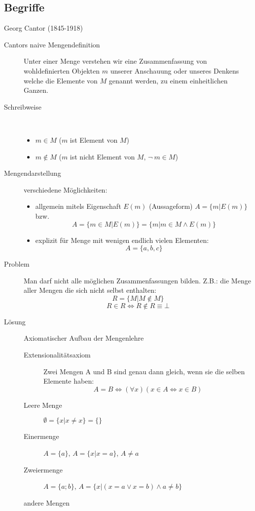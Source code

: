 \documentclass[12pt,a4paper]{article}
\begin{document}
\subsection{Begriffe}
Georg Cantor (1845-1918)
\begin{description}
	\item[Cantors naive Mengendefinition] Unter einer Menge verstehen wir eine Zusammenfassung von wohldefinierten Objekten $m$ unserer Anschauung oder unseres Denkens welche die Elemente von $M$ genannt werden, zu einem einheitlichen Ganzen.
		\item[Schreibweise]\
		\begin{itemize}
			\item $m \in M$ ($m$ ist Element von $M$)
			\item $m \not\in M$ ($m$ ist nicht Element von $M$, $\neg\ m \in M$)
		\end{itemize}
	\item[Mengendarstellung] verschiedene Möglichkeiten:
		\begin{itemize}
			\item allgemein mitels Eigenschaft $E(m)$ (Aussageform) $A=\lbrace m|E(m) \rbrace$ bzw.
			      $$A = \lbrace m \in M | E(m) \rbrace = \lbrace m | m \in M \wedge E(m) \rbrace$$
			\item explizit für Menge mit wenigen endlich vielen Elementen:
			      $$A=\lbrace a, b, c\rbrace$$
		\end{itemize}
	\item[Problem] Man darf nicht alle möglichen Zusammenfassungen bilden. Z.B.: die Menge aller Mengen die sich nicht selbst enthalten:
		$$R=\lbrace M | M \not \in M \rbrace$$
		$$R \in R \Leftrightarrow R \not \in R \equiv \bot$$
	\item[Lösung] Axiomatischer Aufbau der Mengenlehre
		\begin{description}
			\item[Extensionalitätsaxiom] Zwei Mengen A und B sind genau dann gleich, wenn sie die selben Elemente haben:
				$$A = B \Leftrightarrow (\forall x)(x \in A \Leftrightarrow x \in B)$$
			\item[Leere Menge] $\emptyset = \lbrace x | x \not = x\rbrace = \lbrace\rbrace$
			\item[Einermenge] $A=\lbrace a \rbrace$, $A = \lbrace x | x = a \rbrace$, $A \not = a$
			\item[Zweiermenge] $A=\lbrace a; b \rbrace$, $A = \lbrace x|(x=a \vee x=b) \wedge a \not = b \rbrace$
			\item[andere Mengen] \

\end{description}
\end{description}
\end{document}
